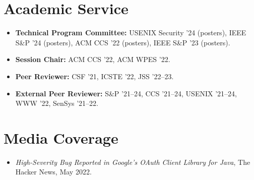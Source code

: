 \documentclass[11pt,letterpaper]{article}
\begin{document}
\section{Academic Service}
\begin{itemize}
  \item \textbf{Technical Program Committee:} USENIX Security '24 (posters),
        IEEE S\&P '24 (posters), ACM CCS '22 (posters), IEEE S\&P '23 (posters).
  \item \textbf{Session Chair:} ACM CCS '22, ACM WPES '22.
  \item \textbf{Peer Reviewer:} CSF '21, ICSTE '22, JSS '22--23.
  \item \textbf{External Peer Reviewer:} S\&P '21--24, CCS '21--24, USENIX '21--24,
        WWW '22, SenSys '21--22.
\end{itemize}

\section{Media Coverage}
\begin{itemize}
  \item \textit{High-Severity Bug Reported in Google's OAuth Client Library for Java},
        The Hacker News, May 2022.
\end{itemize}
\end{document}
